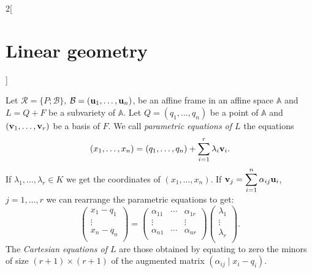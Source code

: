 \documentclass[../../../main.tex]{subfiles}
\begin{document}
\begin{multicols}{2}[\section{Linear geometry}]
\begin{definition}
    \end{definition}
    \begin{definition}
        Let $\mathcal{R}=\{P;\mathcal{B}\}$, $\mathcal{B}=(\boldsymbol{\mathrm{u}}_1,\ldots,\boldsymbol{\mathrm{u}}_n)$, be an affine frame in an affine space $\mathbb{A}$ and $L=Q+F$ be a subvariety of $\mathbb{A}$. Let $Q=(q_1,\ldots,q_n)$ be a point of $\mathbb{A}$ and $(\boldsymbol{\mathrm{v}}_1,\ldots,\boldsymbol{\mathrm{v}}_r)$ be a basis of $F$. We call \textit{parametric equations of $L$} the equations $$(x_1,\ldots,x_n)=(q_1,\ldots,q_n)+\sum_{i=1}^r\lambda_i\boldsymbol{\mathrm{v}}_i.$$ If $\lambda_1,\ldots,\lambda_r\in K$ we get the coordinates of $(x_1,\ldots,x_n)$. If $\displaystyle \boldsymbol{\mathrm{v}}_j=\sum_{i=1}^n\alpha_{ij}\boldsymbol{\mathrm{u}}_i$, $j=1,\ldots,r$ we can rearrange the parametric equations to get: $$\begin{pmatrix}
                x_1-q_1 \\
                \vdots  \\
                x_n-q_n \\
            \end{pmatrix}=\begin{pmatrix}
                \alpha_{11} & \cdots & \alpha_{1r} \\
                \vdots      &        & \vdots      \\
                \alpha_{n1} & \cdots & \alpha_{nr} \\
            \end{pmatrix}\begin{pmatrix}
                \lambda_1 \\
                \vdots    \\
                \lambda_r \\
            \end{pmatrix}.$$ The \textit{Cartesian equations of $L$} are those obtained by equating to zero the minors of size $(r+1)\times(r+1)$ of the augmented matrix $\left(\alpha_{ij}\mid x_i-q_i\right)$.
    \end{definition}

\end{multicols}
\end{document}
